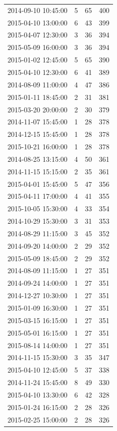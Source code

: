 \begin{tabular}{lrrr}
2014-09-10 10:45:00 & 5 & 65 & 400 \\
2015-04-10 13:00:00 & 6 & 43 & 399 \\
2015-04-07 12:30:00 & 3 & 36 & 394 \\
2015-05-09 16:00:00 & 3 & 36 & 394 \\
2015-01-02 12:45:00 & 5 & 65 & 390 \\
2015-04-10 12:30:00 & 6 & 41 & 389 \\
2014-08-09 11:00:00 & 4 & 47 & 386 \\
2015-01-11 18:45:00 & 2 & 31 & 381 \\
2015-03-20 20:00:00 & 2 & 30 & 379 \\
2014-11-07 15:45:00 & 1 & 28 & 378 \\
2014-12-15 15:45:00 & 1 & 28 & 378 \\
2015-10-21 16:00:00 & 1 & 28 & 378 \\
2014-08-25 13:15:00 & 4 & 50 & 361 \\
2014-11-15 15:15:00 & 2 & 35 & 361 \\
2015-04-01 15:45:00 & 5 & 47 & 356 \\
2015-04-11 17:00:00 & 4 & 41 & 355 \\
2015-10-05 15:30:00 & 4 & 33 & 354 \\
2014-10-29 15:30:00 & 3 & 31 & 353 \\
2014-08-29 11:15:00 & 3 & 45 & 352 \\
2014-09-20 14:00:00 & 2 & 29 & 352 \\
2015-05-09 18:45:00 & 2 & 29 & 352 \\
2014-08-09 11:15:00 & 1 & 27 & 351 \\
2014-09-24 14:00:00 & 1 & 27 & 351 \\
2014-12-27 10:30:00 & 1 & 27 & 351 \\
2015-01-09 16:30:00 & 1 & 27 & 351 \\
2015-03-15 16:15:00 & 1 & 27 & 351 \\
2015-05-01 16:15:00 & 1 & 27 & 351 \\
2015-08-14 14:00:00 & 1 & 27 & 351 \\
2014-11-15 15:30:00 & 3 & 35 & 347 \\
2015-04-10 12:45:00 & 5 & 37 & 338 \\
2014-11-24 15:45:00 & 8 & 49 & 330 \\
2015-04-10 13:30:00 & 6 & 42 & 328 \\
2015-01-24 16:15:00 & 2 & 28 & 326 \\
2015-02-25 15:00:00 & 2 & 28 & 326 \\

\end{tabular}
